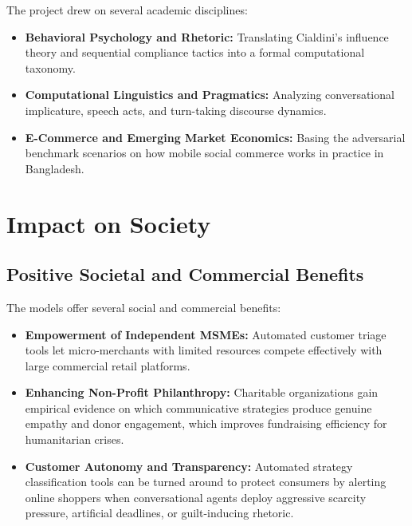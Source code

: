 The project drew on several academic disciplines:
\begin{itemize}
  \item \textbf{Behavioral Psychology and Rhetoric:} Translating Cialdini's influence theory \cite{cialdini2001influence} and sequential compliance tactics \cite{freedman1966compliance,cialdini1975reciprocal} into a formal computational taxonomy.
  \item \textbf{Computational Linguistics and Pragmatics:} Analyzing conversational implicature, speech acts, and turn-taking discourse dynamics.
  \item \textbf{E-Commerce and Emerging Market Economics:} Basing the adversarial benchmark scenarios on how mobile social commerce works in practice in Bangladesh.
\end{itemize}

\section{Impact on Society}
\label{sec:society}

\subsection{Positive Societal and Commercial Benefits}
The models offer several social and commercial benefits:
\begin{itemize}
  \item \textbf{Empowerment of Independent MSMEs:} Automated customer triage tools let micro-merchants with limited resources compete effectively with large commercial retail platforms.
  \item \textbf{Enhancing Non-Profit Philanthropy:} Charitable organizations gain empirical evidence on which communicative strategies produce genuine empathy and donor engagement, which improves fundraising efficiency for humanitarian crises.
  \item \textbf{Customer Autonomy and Transparency:} Automated strategy classification tools can be turned around to protect consumers by alerting online shoppers when conversational agents deploy aggressive scarcity pressure, artificial deadlines, or guilt-inducing rhetoric.
\end{itemize}

